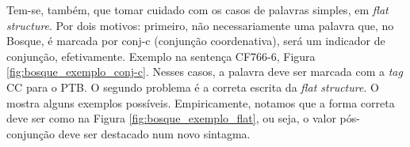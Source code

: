 \begin{center}
    
\end{center}
Tem-se, também, que tomar cuidado com os casos de palavras simples, em \textit{flat structure}. Por dois motivos: primeiro, não necessariamente uma palavra que, no Bosque, é marcada por conj-c (conjunção coordenativa), será um indicador de conjunção, efetivamente. Exemplo na sentença CF766-6, Figura \ref{fig:bosque_exemplo_conj-c}. Nesses casos, a palavra deve ser marcada com a \textit{tag} CC para o PTB. O segundo problema é a correta escrita da \textit{flat structure}. O   mostra alguns exemplos possíveis. Empiricamente, notamos que a forma correta deve ser como na Figura \ref{fig:bosque_exemplo_flat}, ou seja, o valor pós-conjunção deve ser destacado num novo sintagma.
\begin{center}
    
\end{center}
